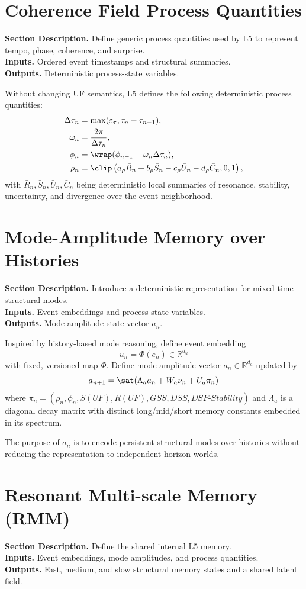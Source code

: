 \documentclass[11pt]{report}
\newcommand{\R}{\mathbb{R}}
\newcommand{\meta}[3]{\textbf{Section Description.} #1\\
\textbf{Inputs.} #2\\
\textbf{Outputs.} #3\par}
\begin{document}
\section{Coherence Field Process Quantities}
\meta{Define generic process quantities used by L5 to represent tempo, phase, coherence, and surprise.}{Ordered event timestamps and structural summaries.}{Deterministic process-state variables.}

Without changing UF semantics, L5 defines the following deterministic process quantities:
\begin{align*}
\Delta\tau_n &= \max(\varepsilon_\tau,\tau_n-\tau_{n-1}),\\
\omega_n &= \frac{2\pi}{\Delta\tau_n},\\
\phi_n &= \wrap(\phi_{n-1}+\omega_n\Delta\tau_n),\\
\rho_n &= \clip\left(a_\rho\bar R_n+b_\rho\bar S_n-c_\rho\bar U_n-d_\rho\bar C_n,0,1\right),
\end{align*}
with $\bar R_n,\bar S_n,\bar U_n,\bar C_n$ being deterministic local summaries of resonance, stability, uncertainty, and divergence over the event neighborhood.

\section{Mode-Amplitude Memory over Histories}
\meta{Introduce a deterministic representation for mixed-time structural modes.}{Event embeddings and process-state variables.}{Mode-amplitude state vector $a_n$.}

Inspired by history-based mode reasoning, define event embedding
\[
u_n = \Phi(e_n) \in \R^{d_u}
\]
with fixed, versioned map $\Phi$. Define mode-amplitude vector $a_n\in\R^{d_a}$ updated by
\[
a_{n+1} = \sat(\Lambda_a a_n + W_a \nu_n + U_a \pi_n)
\]
where $\pi_n=(\rho_n,\phi_n,S(UF),R(UF),GSS,DSS,DSF\text{-}Stability)$ and $\Lambda_a$ is a diagonal decay matrix with distinct long/mid/short memory constants embedded in its spectrum.

The purpose of $a_n$ is to encode persistent structural modes over histories without reducing the representation to independent horizon worlds.

\section{Resonant Multi-scale Memory (RMM)}
\meta{Define the shared internal L5 memory.}{Event embeddings, mode amplitudes, and process quantities.}{Fast, medium, and slow structural memory states and a shared latent field.}
\end{document}
